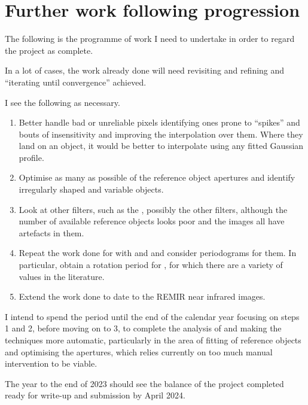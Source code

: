 \section{Further work following progression}
\protect\label{section:worktocome}

The following is the programme of work I need to undertake in order to regard
the project as complete.

In a lot of cases, the work already done will need revisiting and refining and
``iterating until convergence'' achieved.

I see the following as necessary.

\begin{enumerate}
  \item Better handle bad or unreliable pixels identifying ones prone to
  ``spikes'' and bouts of insensitivity and improving the interpolation over
  them. Where they land on an object, it would be better to interpolate using
  any fitted Gaussian profile.
  \item Optimise as many as possible of the reference object apertures and
  identify irregularly shaped and variable objects.
  \item Look at other filters, such as the \gfilter, possibly the other filters,
  although the number of available reference objects looks poor and the
  {\zfilter} images all have artefacts in them.
  \item Repeat the work done for {\ross} with {\prox} and {\bstar} and consider
  periodograms for them. In particular, obtain a rotation period for \bstar,
  for which there are a variety of values in the literature.
  \item Extend the work done to date to the REMIR near infrared images.
\end{enumerate}

I intend to spend the period until the end of the calendar year focusing on
steps 1 and 2, before moving on to 3, to complete the analysis of {\ross} and
making the techniques more automatic, particularly in the area of
fitting of reference objects and optimising the apertures, which relies
currently on too much manual intervention to be viable.

The year to the end of 2023 should see the balance of the project completed
ready for write-up and submission by April 2024.

